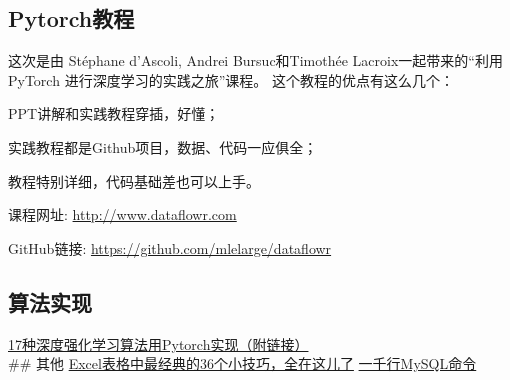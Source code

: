 \documentclass[
]{book}
\begin{document}
\hypertarget{pytorchux6559ux7a0b}{%
\subsection{Pytorch教程}\label{pytorchux6559ux7a0b}}

这次是由 Stéphane d'Ascoli, Andrei Bursuc和Timothée Lacroix一起带来的``利用 PyTorch 进行深度学习的实践之旅''课程。
这个教程的优点有这么几个：

PPT讲解和实践教程穿插，好懂；

实践教程都是Github项目，数据、代码一应俱全；

教程特别详细，代码基础差也可以上手。

课程网址:
\url{http://www.dataflowr.com}

GitHub链接:
\url{https://github.com/mlelarge/dataflowr}

\hypertarget{ux7b97ux6cd5ux5b9eux73b0}{%
\subsection{算法实现}\label{ux7b97ux6cd5ux5b9eux73b0}}

\href{https://mp.weixin.qq.com/s?__biz=MzA4MjYwMTc5Nw==\&mid=2648931942\&idx=3\&sn=b979ab56ef8e1e2ea8e49c9cb8de7913\&chksm=8794ec4cb0e3655a200c3448c963dd260c7988107d6f5774c88a56c849cda6a6a9026a4175e1\&token=2004915986\&lang=en_US\#rd}{17种深度强化学习算法用Pytorch实现（附链接）}\\
\#\# 其他
\href{https://mp.weixin.qq.com/s?__biz=MzA4MjYwMTc5Nw==\&mid=2648931701\&idx=1\&sn=bf2944fa14089af54caec758f5ac8f17\&chksm=8794ef5fb0e3664969832fffd82b93fc376bdd3522d5d4e34804fc2a68681cf27ad744342b97\&token=2004915986\&lang=en_US\#rd}{Excel表格中最经典的36个小技巧，全在这儿了}
\href{https://mp.weixin.qq.com/s?__biz=MzA4MjYwMTc5Nw==\&mid=2648931690\&idx=2\&sn=d35c9677922e69fbcd5b1cf08ad78b7e\&chksm=8794ef40b0e3665611d9db96a8172a52cfd7f7ea58a05ed39695e50661b598f62b58dfc70643\&token=2004915986\&lang=en_US\#rd}{一千行MySQL命令}
\end{document}
